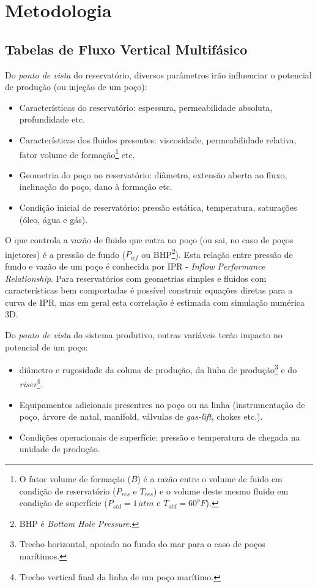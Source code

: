 \documentclass[final,5p]{elsarticle}
\numberwithin{equation}{section}
\begin{document}
\section{Metodologia}

    \subsection{Tabelas de Fluxo Vertical Multifásico}

        Do \emph{ponto de vista} do reservatório, diversos parâmetros irão influenciar o potencial de produção (ou injeção de um poço):

        \begin{itemize}
            \item Características do reservatório: espessura, permeabilidade absoluta, profundidade etc.
            \item Características dos fluidos presentes: viscosidade, permeabilidade relativa, fator volume de formação\footnote{O fator volume de formação ($B$) é a razão entre o volume de fuido em condição de reservatório ($P_{res}$ e $T_{res}$) e o volume deste mesmo fluido em condição de superfície ($P_{std}=1 \, atm$ e $T_{std}=60^oF$).} etc.
            \item Geometria do poço no reservatório: diâmetro, extensão aberta ao fluxo, inclinação do poço, dano à formação etc.
            \item Condição inicial de reservatório: pressão estática, temperatura, saturações (óleo, água e gás).
        \end{itemize}
        
        O que controla a vazão de fluido que entra no poço (ou sai, no caso de poços injetores) é a pressão de fundo ($P_{wf}$ ou BHP\footnote{BHP é \emph{Bottom Hole Pressure}.}). Esta relação entre pressão de fundo e vazão de um poço é conhecida por IPR - \emph{Inflow Performance Relationship}. Para reservatórios com geometrias simples e fluidos com características bem comportadas é possível construir equações diretas para a curva de IPR, mas em geral esta correlação é estimada com simulação numérica 3D.

        Do \emph{ponto de vista} do sistema produtivo, outras variáveis terão impacto no potencial de um poço:

        \begin{itemize}
            \item diâmetro e rugosidade da coluna de produção, da linha de produção\footnote{Trecho horizontal, apoiado no fundo do mar para o caso de poços marítimos.} e do \emph{riser}\footnote{Trecho vertical final da linha de um poço marítimo.}.
            \item Equipamentos adicionais presentres no poço ou na linha (instrumentação de poço, árvore de natal, manifold, válvulas de \emph{gas-lift}, chokes etc.).
            \item  Condições operacionais de superfície: pressão e temperatura de chegada na unidade de produção.
        \end{itemize}
\end{document}
